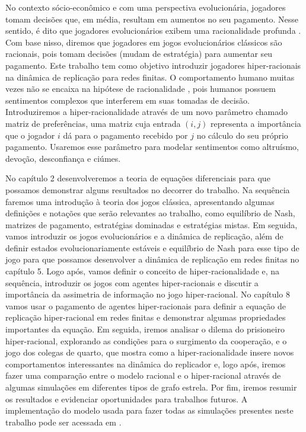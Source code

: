 No contexto sócio-econômico e com uma perspectiva evolucionária, jogadores tomam decisões que, em média, resultam em aumentos no seu pagamento. Nesse sentido, é dito que jogadores evolucionários exibem uma racionalidade profunda \cite{kenrick2009deep}. Com base nisso, diremos que jogadores em jogos evolucionários clássicos são racionais, pois tomam decisões (mudam de estratégia) para aumentar seu pagamento. Este trabalho tem como objetivo introduzir jogadores hiper-racionais \cite{askari2019behavioral} na dinâmica de replicação para redes finitas. O comportamento humano muitas vezes não se encaixa na hipótese de racionalidade \cite{smith1982evolution, sep-game-evolutionary}, pois humanos possuem sentimentos complexos que interferem em suas tomadas de decisão. Introduziremos a hiper-racionalidade através de um novo parâmetro chamado matriz de preferências, uma matriz cuja entrada $(i,j)$ representa a importância que o jogador $i$ dá para o pagamento recebido por $j$ no cálculo do seu próprio pagamento. Usaremos esse parâmetro para modelar sentimentos como altruísmo, devoção, desconfiança e ciúmes. 

No capítulo 2 desenvolveremos a teoria de equações diferenciais para que possamos demonstrar alguns resultados no decorrer do trabalho. Na sequência faremos uma introdução à teoria dos jogos clássica, apresentando algumas definições e notações que serão relevantes ao trabalho, como equilíbrio de Nash, matrizes de pagamento, estratégias dominadas e estratégias mistas. Em seguida, vamos introduzir os jogos evolucionários e a dinâmica de replicação, além de definir estados evolucionariamente estáveis e equilíbrio de Nash para esse tipo de jogo para que possamos desenvolver a dinâmica de replicação em redes finitas no capítulo 5. Logo após, vamos definir o conceito de hiper-racionalidade e, na sequência, introduzir os jogos com agentes hiper-racionais e discutir a importância da assimetria de informação no jogo hiper-racional. No capítulo 8 vamos usar o pagamento de agentes hiper-racionais para definir a equação de replicação hiper-racional em redes finitas e demonstrar algumas propriedades importantes da equação. Em seguida, iremos analisar o dilema do prisioneiro hiper-racional, explorando as condições para o surgimento da cooperação, e o jogo dos colegas de quarto, que mostra como a hiper-racionalidade insere novos comportamentos interessantes na dinâmica do replicador e, logo após, iremos fazer uma comparação entre o modelo racional e o hiper-racional através de algumas simulações em diferentes tipos de grafo estrela. Por fim, iremos resumir os resultados e evidenciar oportunidades para trabalhos futuros. A implementação do modelo usada para fazer todas as simulações presentes neste trabalho pode ser acessada em \cite{Rafael2021}.
